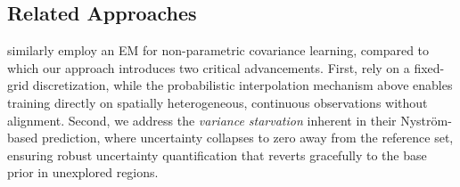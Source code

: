 \documentclass{article}
\begin{document}



\subsection{Related Approaches}
\label{subsec:egps:relations}
\citet{schwaighofer2004learningGPkernels} similarly employ an EM for non-parametric covariance learning, compared to which our approach introduces two critical advancements.
First, \citet{schwaighofer2004learningGPkernels} rely on a fixed-grid discretization, while the probabilistic interpolation mechanism above enables training directly on spatially heterogeneous, continuous observations without alignment.
Second, we address the \textit{variance starvation} inherent in their Nystr\"{o}m-based prediction, where uncertainty collapses to zero away from the reference set, ensuring robust uncertainty quantification that reverts gracefully to the base prior in unexplored regions.
\end{document}
